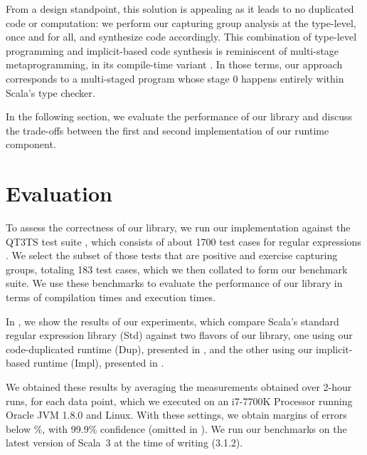 \regexSanitizerTypeClass

From a design standpoint, this solution is appealing as it leads to no duplicated code or computation: we perform our capturing group analysis at the type-level, once and for all, and synthesize code accordingly.
This combination of type-level programming and implicit-based code synthesis is reminiscent of multi-stage metaprogramming, in its com\-pile-time variant \citep{stucki2018practical}.
In those terms, our approach corresponds to a multi-staged program whose stage 0 happens entirely within Scala's type checker.

In the following section, we evaluate the performance of our library and discuss the trade-offs between the first and second implementation of our runtime component.

\section{Evaluation}
\label{sec:evaluation}

To assess the correctness of our library, we run our implementation against the QT3TS test suite \citep{w3c1994xquery}, which consists of about 1700 test cases for regular expressions \citep{w3c1994qt3ts}.
We select the subset of those tests that are positive and exercise capturing groups, totaling 183 test cases, which we then collated to form our benchmark suite.
We use these benchmarks to evaluate the performance of our library in terms of compilation times and execution times.

In , we show the results of our experiments, which compare Scala's standard regular expression library (Std) against two flavors of our library, one using our code-dupli\-cated runtime (Dup), presented in , and the other using our implicit-based runtime (Impl), presented in .


We obtained these results by averaging the measurements obtained over 2-hour runs, for each data point, which we executed on an i7-7700K Processor running Oracle JVM 1.8.0 and Linux.
With these settings, we obtain margins of errors below \%, with 99.9\% confidence (omitted in ).
We run our benchmarks on the latest version of Scala~3 at the time of writing (3.1.2).

